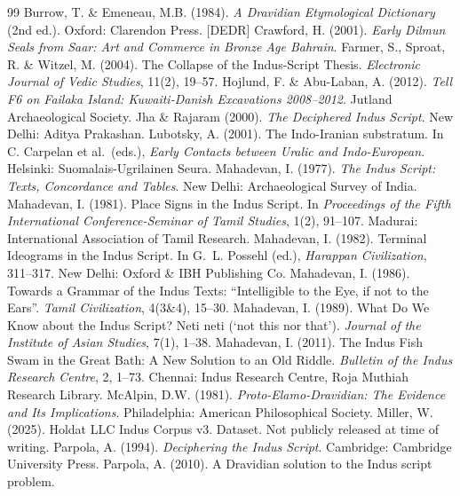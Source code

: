 \documentclass[11pt]{article}
\begin{document}
\begin{thebibliography}{99}
  Burrow, T. \& Emeneau, M.B. (1984). \emph{A Dravidian Etymological
  Dictionary} (2nd ed.). Oxford: Clarendon Press. {[}DEDR{]}
  Crawford, H. (2001). \emph{Early Dilmun Seals from Saar: Art and
  Commerce in Bronze Age Bahrain}.
  Farmer, S., Sproat, R. \& Witzel, M. (2004). The Collapse of the
  Indus-Script Thesis. \emph{Electronic Journal of Vedic Studies},
  11(2), 19--57.
  Hojlund, F. \& Abu-Laban, A. (2012). \emph{Tell F6 on Failaka Island:
  Kuwaiti-Danish Excavations 2008--2012}. Jutland Archaeological
  Society.
  Jha \& Rajaram (2000). \emph{The Deciphered Indus Script}. New
  Delhi: Aditya Prakashan.
  Lubotsky, A. (2001). The Indo-Iranian substratum. In C. Carpelan et
  al.~(eds.), \emph{Early Contacts between Uralic and Indo-European}.
  Helsinki: Suomalais-Ugrilainen Seura.
  Mahadevan, I. (1977). \emph{The Indus Script: Texts, Concordance and
  Tables}. New Delhi: Archaeological Survey of India.
  Mahadevan, I. (1981). Place Signs in the Indus Script. In
  \emph{Proceedings of the Fifth International Conference-Seminar of
  Tamil Studies}, 1(2), 91--107. Madurai: International Association
  of Tamil Research.
  Mahadevan, I. (1982). Terminal Ideograms in the Indus Script. In
  G.~L. Possehl (ed.), \emph{Harappan Civilization}, 311--317. New
  Delhi: Oxford \& IBH Publishing Co.
  Mahadevan, I. (1986). Towards a Grammar of the Indus Texts:
  ``Intelligible to the Eye, if not to the Ears''. \emph{Tamil
  Civilization}, 4(3\&4), 15--30.
  Mahadevan, I. (1989). What Do We Know about the Indus Script? Neti
  neti (`not this nor that'). \emph{Journal of the Institute of Asian
  Studies}, 7(1), 1--38.
  Mahadevan, I. (2011). The Indus Fish Swam in the Great Bath: A New
  Solution to an Old Riddle. \emph{Bulletin of the Indus Research
  Centre}, 2, 1--73. Chennai: Indus Research Centre, Roja Muthiah
  Research Library.
  McAlpin, D.W. (1981). \emph{Proto-Elamo-Dravidian: The Evidence and
  Its Implications}. Philadelphia: American Philosophical Society.
  Miller, W. (2025). Holdat LLC Indus Corpus v3. Dataset. Not publicly released at time of writing.
  Parpola, A. (1994). \emph{Deciphering the Indus Script}. Cambridge:
  Cambridge University Press.
  Parpola, A. (2010). A Dravidian solution to the Indus script problem.

\end{thebibliography}
\end{document}
